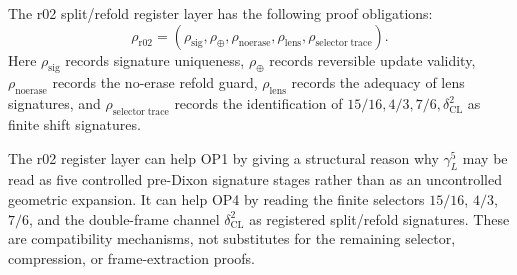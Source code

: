 \begin{definition}
\label{def:r02-proof-obligation-register}
The r02 split/refold register layer has the following proof obligations:
\[
  \rho_{\mathrm{r02}}
  =
  (
    \rho_{\mathrm{sig}},
    \rho_{\oplus},
    \rho_{\mathrm{noerase}},
    \rho_{\mathrm{lens}},
    \rho_{\mathrm{selector\;trace}}
  ).
\]
Here \(\rho_{\mathrm{sig}}\) records signature uniqueness,
\(\rho_{\oplus}\) records reversible update validity,
\(\rho_{\mathrm{noerase}}\) records the no-erase refold guard,
\(\rho_{\mathrm{lens}}\) records the adequacy of lens signatures, and
\(\rho_{\mathrm{selector\;trace}}\) records the identification of
\(15/16,4/3,7/6,\delta_{\mathrm{CL}}^2\) as finite shift signatures.
\end{definition}

\begin{remark}
\label{rem:r02-impact-op1-op4}
The r02 register layer can help OP1 by giving a structural reason why
\(\gamma_L^5\) may be read as five controlled pre-Dixon signature stages
rather than as an uncontrolled geometric expansion.  It can help OP4 by
reading the finite selectors \(15/16\), \(4/3\), \(7/6\), and the
double-frame channel \(\delta_{\mathrm{CL}}^2\) as registered split/refold
signatures.  These are compatibility mechanisms, not substitutes for the
remaining selector, compression, or frame-extraction proofs.
\end{remark}
